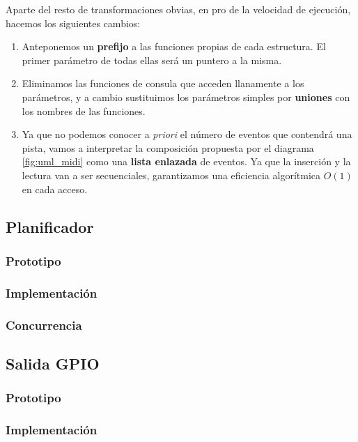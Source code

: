 Aparte del resto de transformaciones obvias, en pro de la velocidad de ejecución, hacemos los siguientes cambios:

\begin{enumerate}
	\item Anteponemos un \textbf{prefijo} a las funciones propias de cada estructura. El primer parámetro de todas ellas será un puntero a la misma.
	
	\item Eliminamos las funciones de consula que acceden llanamente a los parámetros, y a cambio sustituimos los parámetros simples por \textbf{uniones} con los nombres de las funciones.
	
	\item Ya que no podemos conocer a \textit{priori} el número de eventos que contendrá una pista, vamos a interpretar la composición propuesta por el diagrama \ref{fig:uml_midi} como una \textbf{lista enlazada} de eventos. Ya que la inserción y la lectura van a ser secuenciales, garantizamos una eficiencia algorítmica $O(1)$ en cada acceso.
\end{enumerate}

\subsection{Planificador}

\subsubsection{Prototipo}

\subsubsection{Implementación}

\subsubsection{Concurrencia}

\subsection{Salida GPIO}

\subsubsection{Prototipo}

\subsubsection{Implementación}

